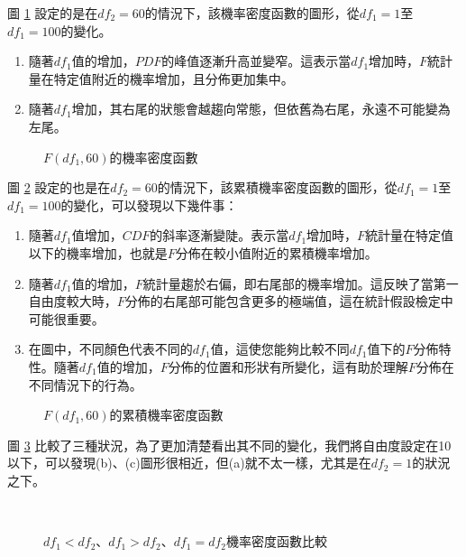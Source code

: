 圖 \ref{fig:F-distribution_pdf_fixeddf2} 設定的是在$df_2=60$的情況下，該機率密度函數的圖形，從$df_1=1$至$df_1=100$的變化。
\begin{enumerate}
\item 隨著$df_1$值的增加，$PDF$的峰值逐漸升高並變窄。這表示當$df_1$增加時，$F$統計量在特定值附近的機率增加，且分佈更加集中。
\item 隨著$df_1$增加，其右尾的狀態會越趨向常態，但依舊為右尾，永遠不可能變為左尾。
\end{enumerate}
\begin{figure}[h]
    \caption{$F(df_1,60)$的機率密度函數}
    \label{fig:F-distribution_pdf_fixeddf2}
\end{figure}
圖 \ref{fig:F-distribution_cdf} 設定的也是在$df_2=60$的情況下，該累積機率密度函數的圖形，從$df_1=1$至$df_1=100$的變化，可以發現以下幾件事：
\begin{enumerate}
\item 隨著$df_1$值增加，$CDF$的斜率逐漸變陡。表示當$df_1$增加時，$F$統計量在特定值以下的機率增加，也就是$F$分佈在較小值附近的累積機率增加。
\item 隨著$df_1$值的增加，$F$統計量趨於右偏，即右尾部的機率增加。這反映了當第一自由度較大時，$F$分佈的右尾部可能包含更多的極端值，這在統計假設檢定中可能很重要。
\item 在圖中，不同顏色代表不同的$df_1$值，這使您能夠比較不同$df_1$值下的$F$分佈特性。隨著$df_1$值的增加，$F$分佈的位置和形狀有所變化，這有助於理解$F$分佈在不同情況下的行為。
\end{enumerate}
\begin{figure}[H]
    \caption{$F(df_1,60)$的累積機率密度函數}
    \label{fig:F-distribution_cdf}
\end{figure}

圖 \ref{fig:F-distribution_pdf_df_1<df_2、df_1>df_2、df_1=df_2} 比較了三種狀況，為了更加清楚看出其不同的變化，我們將自由度設定在10以下，可以發現(b)、(c)圖形很相近，但(a)就不太一樣，尤其是在$df_2=1$的狀況之下。

\begin{figure}[H]
    \centering
        \\
        \subfloat[$F(df_1,df_2),df_1=df_2$]{
        \texttt{[image: \\imgdir F-distribution\_pdf\_df1=df2.png]}}
    \caption{$df_1<df_2$、$df_1>df_2$、$df_1=df_2$機率密度函數比較}
    \label{fig:F-distribution_pdf_df_1<df_2、df_1>df_2、df_1=df_2}
\end{figure}


